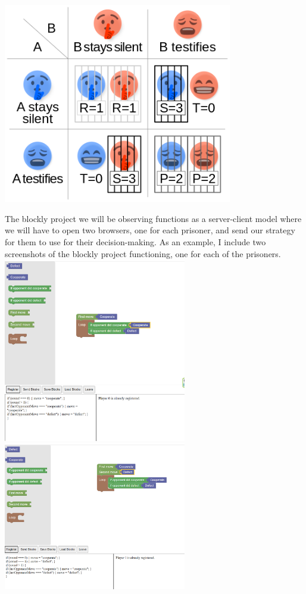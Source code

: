 \documentclass{article}
\theoremstyle{theorem}
\theoremstyle{definition}
\theoremstyle{remark}
\begin{document}
\begin{center}
  \includegraphics[width=10cm]{prisoner_dilemma_desc.png}
\end{center}

The blockly project we will be observing functions as a server-client model where we will have to open two browsers, one for each prisoner, and send our strategy for them to use for their decision-making. As an example, I include two screenshots of the blockly project functioning, one for each of the prisoners. \\

\includegraphics[width=8cm]{prisoner_blockly1.png}
\includegraphics[width=8cm]{prisoner_blockly2.png}
\end{document}
